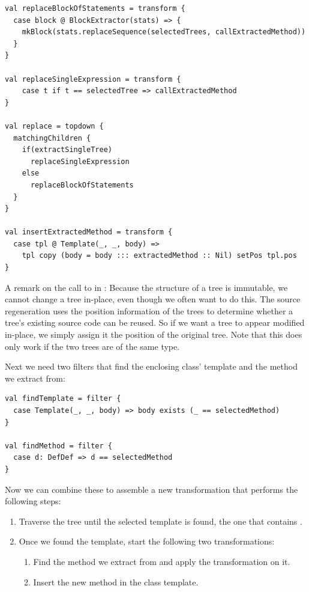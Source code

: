 \begin{lstlisting}
val replaceBlockOfStatements = transform {
  case block @ BlockExtractor(stats) => {
    mkBlock(stats.replaceSequence(selectedTrees, callExtractedMethod))
  }
}

val replaceSingleExpression = transform {
    case t if t == selectedTree => callExtractedMethod
}

val replace = topdown {
  matchingChildren {
    if(extractSingleTree)
      replaceSingleExpression
    else
      replaceBlockOfStatements
  }
}

val insertExtractedMethod = transform {
  case tpl @ Template(_, _, body) => 
    tpl copy (body = body ::: extractedMethod :: Nil) setPos tpl.pos
}
\end{lstlisting}

A remark on the call to  in : Because the structure of a tree is immutable, we cannot change a tree in-place, even though we often want to do this. The source regeneration uses the position information of the trees to determine whether a tree's existing source code can be reused. So if we want a tree to appear modified in-place, we simply assign it the position of the original tree. Note that this does only work if the two trees are of the same type.

Next we need two filters that find the enclosing class' template and the method we extract from:

\begin{lstlisting}
val findTemplate = filter {
  case Template(_, _, body) => body exists (_ == selectedMethod)
}

val findMethod = filter {
  case d: DefDef => d == selectedMethod
}
\end{lstlisting}

Now we can combine these to assemble a new transformation that performs the following steps:

\begin{enumerate}
 \item Traverse the tree until the selected template is found, the one that contains .
 \item Once we found the template, start the following two transformations:
  \begin{enumerate}
        \item Find the method we extract from and apply the  transformation on it.
        \item Insert the new method in the class template.
       \end{enumerate}
\end{enumerate}

